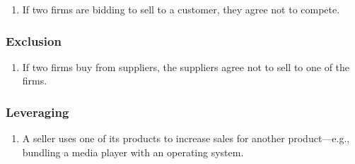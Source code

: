 \begin{enumerate}
    \item If two firms are bidding to sell to a customer, they agree not to 
    compete.
\end{enumerate}

\subsubsection{Exclusion}

\begin{enumerate}
    \item If two firms buy from suppliers, the suppliers agree not to sell to 
    one of the firms.
\end{enumerate}

\subsubsection{Leveraging}

\begin{enumerate}
    \item A seller uses one of its products to increase sales for another 
    product---e.g., bundling a media player with an operating system.
\end{enumerate}
